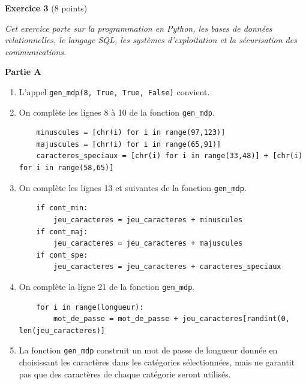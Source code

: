 \documentclass[11pt,a4paper]{article}
\newcommand{\mip}[1]{\texttt{#1}}
\begin{document}
\bigskip


\textbf{Exercice 3} (8 points)

\medskip

\textit{Cet exercice porte sur la programmation en Python, les bases de données
relationnelles, le langage SQL, les systèmes d’exploitation et la sécurisation des
communications.}

\medskip

\textbf{Partie A}

\begin{enumerate}
\item L'appel \mip{gen_mdp(8, True, True, False)} convient.
\item On complète les lignes 8 à 10 de la fonction \mip{gen_mdp}.

\begin{verbatim}
    minuscules = [chr(i) for i in range(97,123)]
    majuscules = [chr(i) for i in range(65,91)]
    caracteres_speciaux = [chr(i) for i in range(33,48)] + [chr(i) for i in range(58,65)]
\end{verbatim}


\item On complète les lignes 13 et suivantes de la fonction \mip{gen_mdp}.

\begin{verbatim}
    if cont_min:
        jeu_caracteres = jeu_caracteres + minuscules
    if cont_maj:
        jeu_caracteres = jeu_caracteres + majuscules
    if cont_spe:
        jeu_caracteres = jeu_caracteres + caracteres_speciaux
\end{verbatim}


\item On complète la ligne 21 de la fonction \mip{gen_mdp}.

\begin{verbatim}
    for i in range(longueur):
        mot_de_passe = mot_de_passe + jeu_caracteres[randint(0, len(jeu_caracteres)] 
\end{verbatim}


\item La fonction \mip{gen_mdp} construit un mot de passe de longueur donnée en choisissant les caractères dans les catégories sélectionnées, mais ne garantit pas que des caractères de chaque catégorie seront utilisés.

\end{enumerate}

\bigskip
\end{document}

